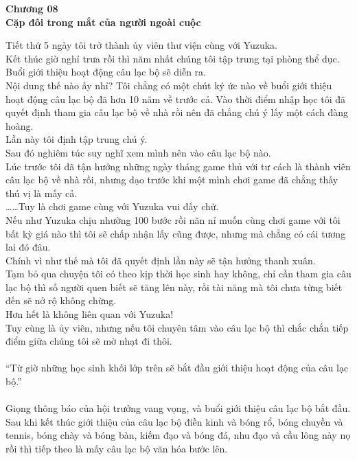 \documentclass[12pt,a4paper, twosides]{book}
\begin{document}
    \begin{center}
    \textbf{\large Chương 08 \\ Cặp đôi trong mắt của người ngoài cuộc}
    \end{center}
    \noindent
Tiết thứ 5 ngày tôi trở thành ủy viên thư viện cùng với Yuzuka.\\
Kết thúc giờ nghỉ trưa rồi thì năm nhất chúng tôi tập trung tại phòng thể dục. Buổi giới thiệu hoạt động câu lạc bộ sẽ diễn ra.\\
Nội dung thế nào ấy nhỉ? Tôi chẳng có một chút ký ức nào về buổi giới thiệu hoạt động câu lạc bộ đã hơn 10 năm về trước cả. Vào thời điểm nhập học tôi đã quyết định tham gia câu lạc bộ về nhà rồi nên đã chẳng chú ý lấy một cách đàng hoàng.\\
Lần này tôi định tập trung chú ý.\\
Sau đó nghiêm túc suy nghĩ xem mình nên vào câu lạc bộ nào.\\
Lúc trước tôi đã tận hưởng những ngày tháng game thủ với tư cách là thành viên câu lạc bộ về nhà rồi, nhưng dạo trước khi một mình chơi game đã chẳng thấy thú vị là mấy cả.\\
……Tuy là chơi game cùng với Yuzuka vui đấy chứ.\\
Nếu như Yuzuka chịu nhường 100 bước rồi năn nỉ muốn cùng chơi game với tôi bất kỳ giá nào thì tôi sẽ chấp nhận lấy cũng được, nhưng mà chẳng có cái tương lai đó đâu.\\
Chính vì như thế mà tôi đã quyết định lần này sẽ tận hưởng thanh xuân.\\
Tạm bỏ qua chuyện tôi có theo kịp thời học sinh hay không, chỉ cần tham gia câu lạc bộ thì số người quen biết sẽ tăng lên này, rồi tài năng mà tôi chưa từng biết đến sẽ nở rộ không chừng.\\
Hơn hết là không liên quan với Yuzuka!\\
Tuy cùng là ủy viên, nhưng nếu tôi chuyên tâm vào câu lạc bộ thì chắc chắn tiếp điểm giữa chúng tôi sẽ mờ nhạt đi thôi.\\
\\
“Từ giờ những học sinh khối lớp trên sẽ bắt đầu giới thiệu hoạt động của câu lạc bộ.”\\
\\
Giọng thông báo của hội trưởng vang vọng, và buổi giới thiệu câu lạc bộ bắt đầu.\\
Sau khi kết thúc giới thiệu của câu lạc bộ điền kinh và bóng rổ, bóng chuyền và tennis, bóng chày và bóng bàn, kiếm đạo và bóng đá, nhu đạo và cầu lông này nọ rồi thì tiếp theo là mấy câu lạc bộ văn hóa bước lên.\\
\end{document}
